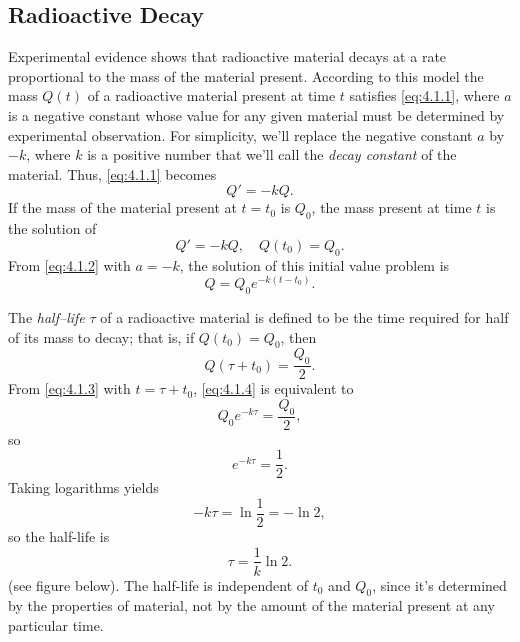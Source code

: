 \documentclass{ximera}
\begin{document}
\subsection*{Radioactive Decay}

Experimental evidence shows that radioactive material decays at a rate
proportional to the mass of the material present. According to this
model the mass $Q(t)$ of a radioactive material present at time $t$
satisfies \eqref{eq:4.1.1}, where $a$ is a negative constant whose value
for any given material must be determined by experimental observation.
For simplicity, we'll replace the negative constant $a$ by
$-k$, where
$k$ is a positive number that we'll call the \textit{decay constant}
of the material. Thus, \eqref{eq:4.1.1} becomes
$$
Q'=-kQ.
$$
If the mass of the material present
at $t=t_0$ is $Q_0$,  the mass present at time $t$ is
 the solution of
$$
Q'=-kQ,\quad  Q(t_0)=Q_0.
$$
From \eqref{eq:4.1.2}  with $a=-k$, the solution of this initial value
problem is
\begin{equation} \label{eq:4.1.3}
Q=Q_0e^{-k(t-t_0)}.
\end{equation}

The \textit{half--life} $\tau$ of a radioactive material is defined to be
the time required for half of its mass to decay; that is, if
$Q(t_0)=Q_0$, then \begin{equation} \label{eq:4.1.4} Q(\tau+t_0)=\frac{Q_0}{2}.
\end{equation}
 From \eqref{eq:4.1.3} with $t=\tau+t_0$, \eqref{eq:4.1.4} is equivalent to
$$
Q_0e^{-k\tau}=\frac{Q_0}{2},
$$
 so
$$
e^{-k\tau}=\frac{1}{2}.
$$
 Taking logarithms  yields
$$
-k\tau=\ln\frac{1}{2}=-\ln2,
$$
 so the half-life is
\begin{equation} \label{eq:4.1.5}
\tau=\frac{1}{k}\ln2.
\end{equation}
(see figure below).
The half-life is independent of $t_0$ and
$Q_0$, since it's determined by the properties of material, not by
the amount of the material present at any particular time.

\begin{center}
\end{center}


\end{document}
